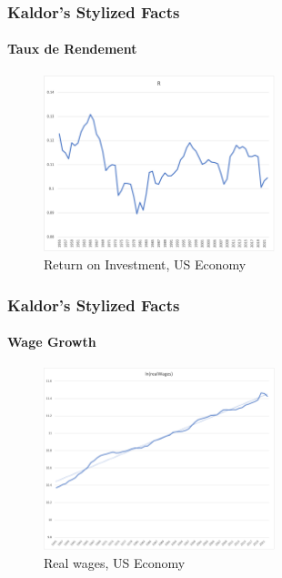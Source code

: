 \documentclass{beamer}
\begin{document}
\begin{frame}
    \frametitle{Kaldor's Stylized Facts}
    \hypertarget{return}{} %
    \framesubtitle{Taux de Rendement}
        \begin{figure}
            \centering
            \includegraphics[width=0.6\textwidth]{graphs/r_usa.png}
            \caption{Return on Investment, US Economy
            \hyperlink{kaldor}{}}
        \end{figure}
\end{frame}

\begin{frame}
    \frametitle{Kaldor's Stylized Facts}
    \hypertarget{wages}{} %
    \framesubtitle{Wage Growth}
        \begin{figure}
            \centering
            \includegraphics[width=0.6\textwidth]{graphs/lnwages_usa.png}
            \caption{Real wages, US Economy
            \hyperlink{kaldor}{}}

        \end{figure}
\end{frame}

\end{document}
